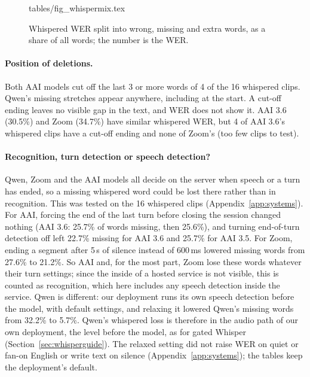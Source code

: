 \documentclass[11pt]{article}
\begin{document}
\begin{figure}[!htbp]
\centering
\tabinput tables/fig_whispermix.tex
\caption{Whispered WER split into wrong, missing and extra words, as a share of all words; the number is the WER.}
\label{fig:whispermix}
\end{figure}

\paragraph{Position of deletions.} Both AAI models cut off the last 3 or more words of 4 of the 16 whispered clips. Qwen's missing stretches appear anywhere, including at the start. A cut-off ending leaves no visible gap in the text, and WER does not show it. AAI 3.6 (30.5\%) and Zoom (34.7\%) have similar whispered WER, but 4 of AAI 3.6's whispered clips have a cut-off ending and none of Zoom's (too few clips to test).

\paragraph{Recognition, turn detection or speech detection?} Qwen, Zoom and the AAI models all decide on the server when speech or a turn has ended, so a missing whispered word could be lost there rather than in recognition. This was tested on the 16 whispered clips (Appendix~\ref{app:systems}). For AAI, forcing the end of the last turn before closing the session changed nothing (AAI 3.6: 25.7\% of words missing, then 25.6\%), and turning end-of-turn detection off left 22.7\% missing for AAI 3.6 and 25.7\% for AAI 3.5. For Zoom, ending a segment after 5\,s of silence instead of 600\,ms lowered missing words from 27.6\% to 21.2\%. So AAI and, for the most part, Zoom lose these words whatever their turn settings; since the inside of a hosted service is not visible, this is counted as recognition, which here includes any speech detection inside the service. Qwen is different: our deployment runs its own speech detection before the model, with default settings, and relaxing it lowered Qwen's missing words from 32.2\% to 5.7\%. Qwen's whispered loss is therefore in the audio path of our own deployment, the level before the model, as for gated Whisper (Section~\ref{sec:whisperguide}). The relaxed setting did not raise WER on quiet or fan-on English or write text on silence (Appendix~\ref{app:systems}); the tables keep the deployment's default.
\end{document}
